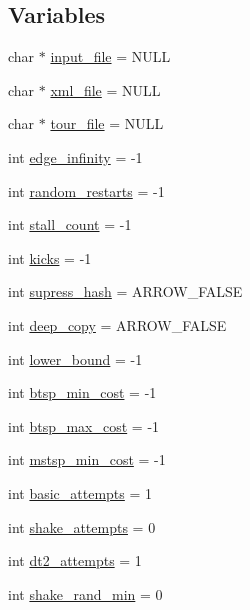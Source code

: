 \subsection*{Variables}
\begin{CompactItemize}
\item 
char $\ast$ \hyperlink{bin_2baltsp-ib2_8c_a4f3a15de34c409bdec6ceacf93078ed}{input\_\-file} = NULL
\item 
char $\ast$ \hyperlink{bin_2baltsp-ib2_8c_bf4e392494984c6ef8259268eb1fe421}{xml\_\-file} = NULL
\item 
char $\ast$ \hyperlink{bin_2baltsp-ib2_8c_b818a82f867be75d7c4d92d792b0943e}{tour\_\-file} = NULL
\item 
int \hyperlink{bin_2baltsp-ib2_8c_61a12d5995172f376610cce2f19e5855}{edge\_\-infinity} = -1
\item 
int \hyperlink{bin_2baltsp-ib2_8c_e6a9db0fe5c8a0407d62dec2f7a14959}{random\_\-restarts} = -1
\item 
int \hyperlink{bin_2baltsp-ib2_8c_a1641a28cf3ea572a56763e84518c17b}{stall\_\-count} = -1
\item 
int \hyperlink{bin_2baltsp-ib2_8c_b8f057ba1ad6b7f0c46f8140b25b3467}{kicks} = -1
\item 
int \hyperlink{bin_2baltsp-ib2_8c_c022145e682345ed4064bad274e5a4f1}{supress\_\-hash} = ARROW\_\-FALSE
\item 
int \hyperlink{bin_2baltsp-ib2_8c_7298da576a5b127d04b4c46b3bc78821}{deep\_\-copy} = ARROW\_\-FALSE
\item 
int \hyperlink{bin_2baltsp-ib2_8c_ed7394fd8e0c2796b26b9654fd10fd9d}{lower\_\-bound} = -1
\item 
int \hyperlink{bin_2baltsp-ib2_8c_97987334c96a847ff74c2c6c83d78a73}{btsp\_\-min\_\-cost} = -1
\item 
int \hyperlink{bin_2baltsp-ib2_8c_8135b6557d64f65441d8f07fdc21ffdc}{btsp\_\-max\_\-cost} = -1
\item 
int \hyperlink{bin_2baltsp-ib2_8c_79e1b33b7d744b8baacfe9c0b2e73013}{mstsp\_\-min\_\-cost} = -1
\item 
int \hyperlink{bin_2baltsp-ib2_8c_227b7ec968925f365b96a92ace419c56}{basic\_\-attempts} = 1
\item 
int \hyperlink{bin_2baltsp-ib2_8c_a4451667ac0b07bcf8396ecdb8c90f6e}{shake\_\-attempts} = 0
\item 
int \hyperlink{bin_2baltsp-ib2_8c_d4c3a6197eb631f711a3baf6af37e85c}{dt2\_\-attempts} = 1
\item 
int \hyperlink{bin_2baltsp-ib2_8c_b7fc57ece1162e77f74b4803961b72cb}{shake\_\-rand\_\-min} = 0

\end{CompactItemize}
